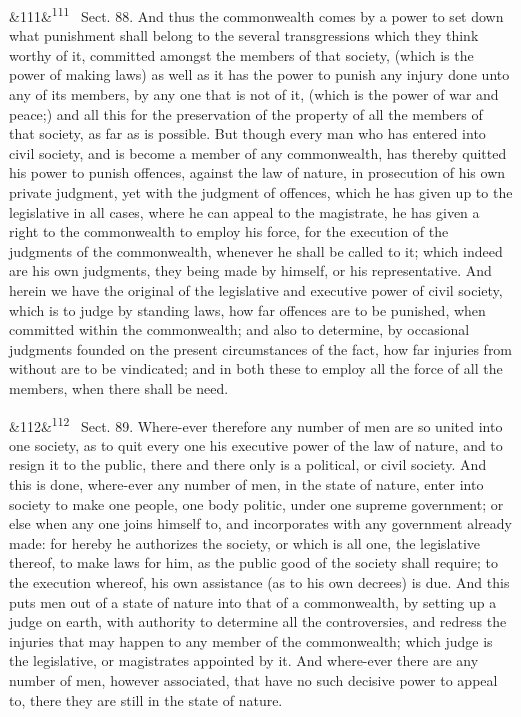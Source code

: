 \documentclass[12pt]{article}
\newcommand{\para}[1][]{\par\noindent\ifx&#1&\else\textsuperscript{\footnotesize #1}~\fi}
\begin{document}
\para[111] Sect. 88. And thus the commonwealth comes by a power to set down what punishment shall belong to the several transgressions which they think worthy of it, committed amongst the members of that society, (which is the power of making laws) as well as it has the power to punish any injury done unto any of its members, by any one that is not of it, (which is the power of war and peace;) and all this for the preservation of the property of all the members of that society, as far as is possible. But though every man who has entered into civil society, and is become a member of any commonwealth, has thereby quitted his power to punish offences, against the law of nature, in prosecution of his own private judgment, yet with the judgment of offences, which he has given up to the legislative in all cases, where he can appeal to the magistrate, he has given a right to the commonwealth to employ his force, for the execution of the judgments of the commonwealth, whenever he shall be called to it; which indeed are his own judgments, they being made by himself, or his representative. And herein we have the original of the legislative and executive power of civil society, which is to judge by standing laws, how far offences are to be punished, when committed within the commonwealth; and also to determine, by occasional judgments founded on the present circumstances of the fact, how far injuries from without are to be vindicated; and in both these to employ all the force of all the members, when there shall be need.

\para[112] Sect. 89. Where-ever therefore any number of men are so united into one society, as to quit every one his executive power of the law of nature, and to resign it to the public, there and there only is a political, or civil society. And this is done, where-ever any number of men, in the state of nature, enter into society to make one people, one body politic, under one supreme government; or else when any one joins himself to, and incorporates with any government already made: for hereby he authorizes the society, or which is all one, the legislative thereof, to make laws for him, as the public good of the society shall require; to the execution whereof, his own assistance (as to his own decrees) is due. And this puts men out of a state of nature into that of a commonwealth, by setting up a judge on earth, with authority to determine all the controversies, and redress the injuries that may happen to any member of the commonwealth; which judge is the legislative, or magistrates appointed by it. And where-ever there are any number of men, however associated, that have no such decisive power to appeal to, there they are still in the state of nature.
\end{document}

